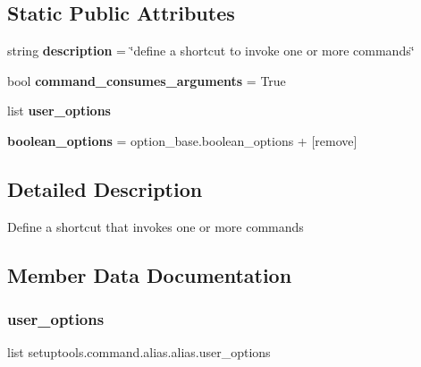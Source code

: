 \subsection*{Static Public Attributes}
\begin{DoxyCompactItemize}
\item 
\mbox{\label{classsetuptools_1_1command_1_1alias_1_1alias_acc4a874df88de32f99a391786612d452}} 
string {\bfseries description} = \char`\"{}define a shortcut to invoke one or more commands\char`\"{}
\item 
\mbox{\label{classsetuptools_1_1command_1_1alias_1_1alias_a5b5d80b3991de223f5768408bc8b633e}} 
bool {\bfseries command\+\_\+consumes\+\_\+arguments} = True
\item 
list {\bfseries user\+\_\+options}
\item 
\mbox{\label{classsetuptools_1_1command_1_1alias_1_1alias_aefdfd87968352a45374d295ebcb6d363}} 
{\bfseries boolean\+\_\+options} = option\+\_\+base.\+boolean\+\_\+options + \mbox{[}\textquotesingle{}remove\textquotesingle{}\mbox{]}
\end{DoxyCompactItemize}


\subsection{Detailed Description}
\begin{DoxyVerb}Define a shortcut that invokes one or more commands\end{DoxyVerb}
 

\subsection{Member Data Documentation}
\mbox{\label{classsetuptools_1_1command_1_1alias_1_1alias_a5ccea17b6219cdcee3c21f60c81636c6}} 
\subsubsection{\texorpdfstring{user\+\_\+options}{user\_options}}
{\footnotesize\ttfamily list setuptools.\+command.\+alias.\+alias.\+user\+\_\+options\hspace{0.3cm}{\ttfamily [static]}}


